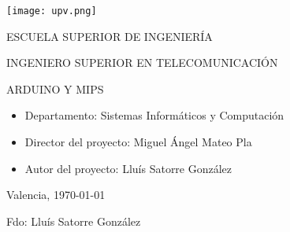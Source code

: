 

\begin{center}

  \texttt{[image: upv.png]} \\

  \vspace{2.0cm}

  \Large{ESCUELA SUPERIOR DE INGENIERÍA} \\

  \vspace{1.0cm}

  \large{INGENIERO SUPERIOR EN TELECOMUNICACIÓN} \\

  \vspace{2.0cm}

  \large{ARDUINO Y MIPS} \\

  \vspace{1.0cm}

\end{center}

\begin{itemize}
\item \large{Departamento: Sistemas Informáticos y Computación}
\item \large{Director del proyecto: Miguel Ángel Mateo Pla}
\item \large{Autor del proyecto: Lluís Satorre González}
\end{itemize}

\vspace{1.0cm}

\begin{flushright}
  \large{Valencia, \today} \\

  \vspace{2.5cm}

  \large{Fdo: Lluís Satorre González}
\end{flushright}
